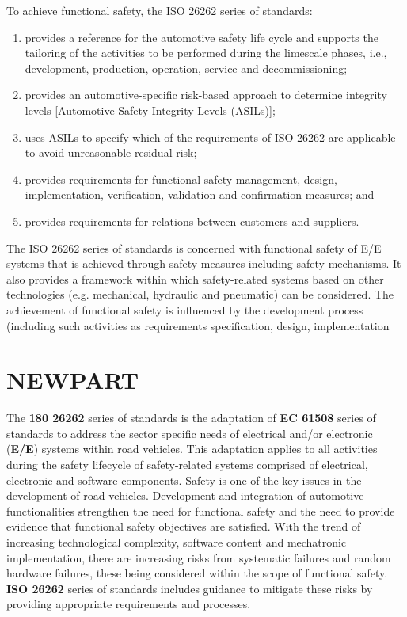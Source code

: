 \documentclass[./dissertation.tex]{subfiles}
\begin{document}
To achieve functional safety, the ISO 26262 series of standards:
\begin{enumerate}
\item provides a reference for the automotive safety life cycle and supports the tailoring of the activities to be performed during the limescale phases, i.e., development, production, operation, service and decommissioning;
\item provides an automotive-specific risk-based approach to determine integrity levels [Automotive Safety Integrity Levels (ASILs)];
\item uses ASILs to specify which of the requirements of ISO 26262 are applicable to avoid unreasonable residual risk;
\item provides requirements for functional safety management, design, implementation, verification, validation and confirmation measures; and
\item provides requirements for relations between customers and suppliers.
\end{enumerate}

The ISO 26262 series of standards is concerned with functional safety of E/E systems that is achieved through safety measures including safety mechanisms. It also provides a framework within which safety-related systems based on other technologies (e.g. mechanical, hydraulic and pneumatic) can be considered. The achievement of functional safety is influenced by the development process (including such activities as requirements specification, design, implementation




\section {NEWPART}
The \textbf{180 26262} series of standards is the adaptation of \textbf{EC 61508} series of standards to address the sector specific needs of electrical and/or electronic (\textbf{E/E}) systems within road vehicles. This adaptation applies to all activities during the safety lifecycle of safety-related systems comprised of electrical, electronic and software components. Safety is one of the key issues in the development of road vehicles. Development and integration of automotive functionalities strengthen the need for functional safety and the need to provide evidence that functional safety objectives are satisfied. With the trend of increasing technological complexity, software content and mechatronic implementation, there are increasing risks from systematic failures and random hardware failures, these being considered within the scope of functional safety. \textbf{ISO 26262} series of standards includes guidance to mitigate these risks by providing appropriate requirements and processes.
\end{document}

